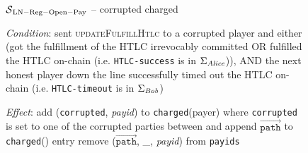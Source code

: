 \begin{figure}[H]
  \begin{simulatorbox}{$\mathcal{S}{}_{\mathrm{LN - Reg - Open - Pay}}$ --
  corrupted charged}
    \begin{algorithmic}[1]
      \Statex \textit{Condition}:
      \Indent
        \State \alice{} sent \textsc{updateFulfillHtlc} to a corrupted player
        and either (got the fulfillment of the HTLC irrevocably committed OR
        fulfilled the HTLC on-chain (i.e. \texttt{HTLC-success} is in
        $\Sigma_{\mathit{Alice}}$)), AND the next honest player \bob{} down the line
        successfully timed out the HTLC on-chain (i.e. \texttt{HTLC-timeout} is
        in $\Sigma_{\mathit{Bob}}$)
      \EndIndent
      \Statex

      \Statex \textit{Effect}:
      \Indent
        \State add (\texttt{corrupted}, \textit{payid}) to
        \texttt{charged}(payer) where \texttt{corrupted} is set to one of the
        corrupted parties between \alice{} and \bob{}
          \State append $\overrightarrow{\mathtt{path}}$ to
          \texttt{charged}(\alice) entry
        \EndIf
        \State remove ($\overrightarrow{\mathtt{path}}$, \_, \textit{payid})
        from \texttt{payids}
      \EndIndent
    \end{algorithmic}
  \end{simulatorbox}
  \caption{}
  \label{alg:sim:resolvepay:corrupted:fig}
\end{figure}

